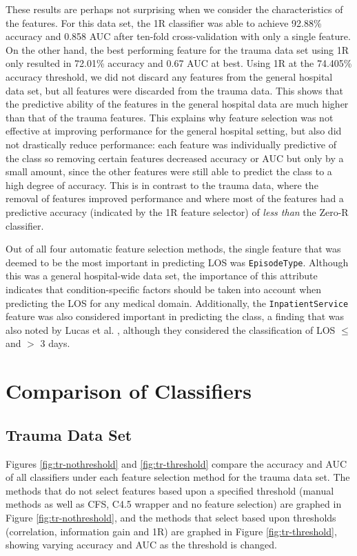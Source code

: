 These results are perhaps not surprising when we consider the characteristics
of the features. For this data set, the 1R classifier was able to achieve
92.88\% accuracy and
0.858 AUC after ten-fold cross-validation with only a single feature. On the
other hand, the best
performing feature for the trauma data set using 1R only resulted in 72.01\%
accuracy and 0.67 AUC at best. Using 1R at the 74.405\% accuracy threshold,
we did not discard any features from the general hospital data set, but all
features were discarded from the trauma data. This shows that the predictive
ability of the features in the general hospital data are much higher than
that of the trauma features. This explains why feature
selection was not effective at improving performance for the general hospital
setting, but also did not drastically reduce performance: each feature
was individually predictive of the
class so removing certain features decreased accuracy or AUC but only by a
small amount, since the other features were still able to predict the class
to a high degree of accuracy. This is in contrast to the trauma data, where
the removal of features improved performance and where most of the features
had a predictive accuracy (indicated by the 1R feature selector) of
\textit{less than} the Zero-R classifier.

Out of all four automatic feature selection methods, the single feature that
was deemed to be the most important in predicting LOS was \texttt{EpisodeType}.
Although this was a general hospital-wide data set, the importance of this
attribute indicates that condition-specific factors should be taken into
account when predicting the LOS for any medical domain. Additionally, the
\texttt{InpatientService} feature was also considered important in predicting
the class, a finding that was also noted by Lucas et al. \cite{Lucas2009},
although they considered the classification of LOS $\leq$ and $>$ 3 days.

\section{Comparison of Classifiers}
\subsection{Trauma Data Set}
Figures \ref{fig:tr-nothreshold} and \ref{fig:tr-threshold} compare the
accuracy and AUC of all classifiers under each feature selection method for
the trauma data set.
The methods that do not select features based upon a specified threshold
(manual methods as well as CFS, C4.5 wrapper and no feature selection)
are graphed in Figure \ref{fig:tr-nothreshold}, and the methods that select
based upon thresholds (correlation, information gain and 1R) are graphed
in Figure \ref{fig:tr-threshold}, showing varying accuracy and AUC as the
threshold is changed.

